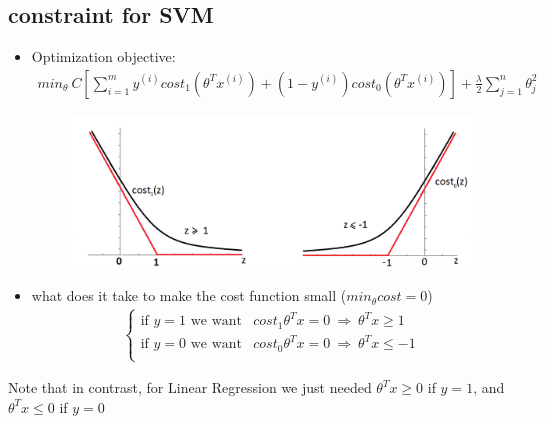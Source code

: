 \documentclass[a4paper,12pt]{report}
\begin{document}
\subsection{constraint for SVM}
\begin{itemize}
\item Optimization objective: 
\begin{align}
min _{\theta} \ C \left[ \sum_{i=1} ^m y^{(i)} cost_1 (\theta^T x^{(i)}) + (1-y^{(i)}) cost_0( \theta^T x^{(i)})\right] + \frac{\lambda}{2} \sum_{j=1} ^{n} \theta_j ^2
\end{align}
\begin{figure}[H]
	\centering
        \includegraphics[totalheight=4 cm]{y0-1.png}
\end{figure}
\end{itemize}
\begin{itemize}
\item what does it take to make the cost function small ($min_{\theta} cost = 0$)
\begin{align}
\begin{cases}
    \text{if $y=1$ we want} & cost_1 \theta^T x = 0 \ \Rightarrow  \ \theta^T x \geq 1  \\
    \text{if $y=0$ we want} & cost_0 \theta^T x = 0 \ \Rightarrow  \  \theta^T x \leq -1 \\
  \end{cases}
\end{align}
\end{itemize}
Note that in contrast, for Linear Regression we just needed $\theta^T x \geq 0$ if $y=1$, and $\theta^T x \leq 0$ if $y=0$
\end{document}
